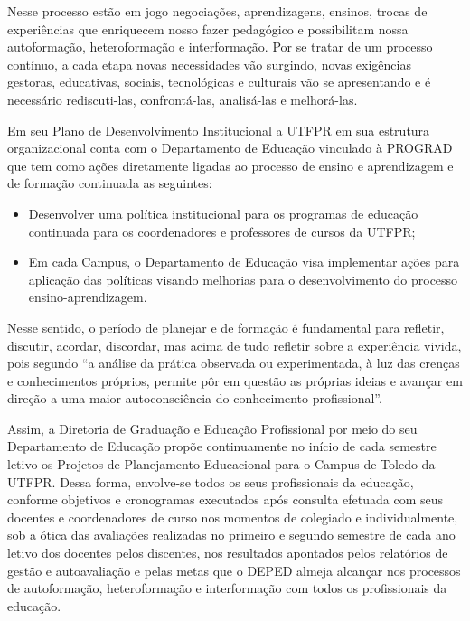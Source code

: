 Nesse processo estão em jogo negociações, aprendizagens, ensinos, trocas de experiências que enriquecem nosso fazer pedagógico e possibilitam nossa autoformação, heteroformação e interformação. Por se tratar de um processo contínuo, a cada etapa novas necessidades vão surgindo, novas exigências gestoras, educativas, sociais, tecnológicas e culturais vão se apresentando e é necessário rediscuti-las, confrontá-las, analisá-las e melhorá-las.

Em seu Plano de Desenvolvimento Institucional \cite{pdiutfpr} a UTFPR em sua estrutura organizacional conta com o Departamento de Educação vinculado à PROGRAD que tem como ações diretamente ligadas ao processo de ensino e aprendizagem e de formação continuada as seguintes:

\begin{itemize}
    \item Desenvolver uma política institucional para os programas de educação continuada para os coordenadores e professores de cursos da UTFPR;
    \item Em cada Campus, o Departamento de Educação visa implementar ações para aplicação das políticas visando melhorias para o desenvolvimento do processo ensino-aprendizagem.
\end{itemize}

Nesse sentido, o período de planejar e de formação é fundamental para refletir, discutir, acordar, discordar, mas acima de tudo refletir sobre a experiência vivida, pois segundo  \cite[p. 41]{vaillant2012ensinando} ``a análise da prática observada ou experimentada, à luz das crenças e conhecimentos próprios, permite pôr em questão as próprias ideias e avançar em direção a uma maior autoconsciência do conhecimento profissional''.

Assim, a Diretoria de Graduação e Educação Profissional por meio do seu Departamento de Educação propõe continuamente no início de cada semestre letivo os Projetos de Planejamento Educacional para o Campus de Toledo da UTFPR. Dessa forma, envolve-se todos os seus profissionais da educação, conforme objetivos e cronogramas executados após consulta efetuada com seus docentes e coordenadores de curso nos momentos de colegiado e individualmente, sob a ótica das avaliações realizadas no primeiro e segundo semestre de cada ano letivo dos docentes pelos discentes, nos resultados apontados pelos relatórios de gestão e autoavaliação e pelas metas que o DEPED almeja alcançar nos processos de autoformação, heteroformação e interformação com todos os profissionais da educação.

